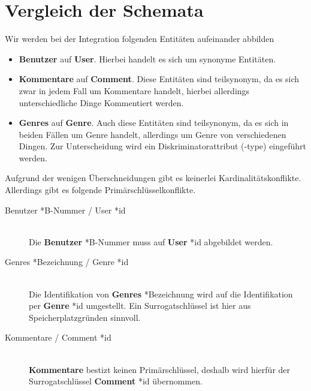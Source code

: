 \documentclass[11pt,a4paper,DIV=9]{scrartcl}
\begin{document}
\section{Vergleich der Schemata}
  Wir werden bei der Integration folgenden Entitäten aufeinander abbilden
  \begin{itemize}
    \item \textbf{Benutzer} auf \textbf{User}. Hierbei handelt es sich um synonyme Entitäten.
    \item \textbf{Kommentare} auf \textbf{Comment}. Diese Entitäten sind teilsynonym, da es sich zwar in jedem Fall um Kommentare handelt, hierbei allerdings unterschiedliche Dinge Kommentiert werden.
    \item \textbf{Genres} auf \textbf{Genre}. Auch diese Entitäten sind teilsynonym, da es sich in beiden Fällen um Genre handelt, allerdings um Genre von verschiedenen Dingen. Zur Unterscheidung wird ein Diskriminatorattribut (-type) eingeführt werden. 
  \end{itemize}

  Aufgrund der wenigen Überschneidungen gibt es keinerlei Kardinalitätskonflikte. Allerdings gibt es folgende Primärschlüsselkonflikte.
  \begin{description}
    \item[Benutzer *B-Nummer / User *id] \hfill \\
      Die \textbf{Benutzer} *B-Nummer muss auf \textbf{User} *id abgebildet werden.
    \item[Genres *Bezeichnung / Genre *id] \hfill \\
      Die Identifikation von \textbf{Genres} *Bezeichnung wird auf die Identifikation per \textbf{Genre} *id umgestellt. Ein Surrogatschlüssel ist hier aus Speicherplatzgründen sinnvoll.
    \item[Kommentare / Comment *id] \hfill \\
      \textbf{Kommentare} bestizt keinen Primärschlüssel, deshalb wird hierfür der Surrogatschlüssel \textbf{Comment} *id übernommen.
  \end{description}
  
\end{document}
